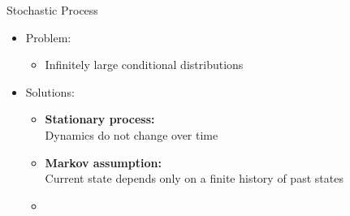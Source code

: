 \documentclass[11pt,table]{beamer}
\begin{document}
\begin{frame}{Stochastic Process}

\begin{itemize}
    \item  Problem:
\begin{itemize}
    \item  Infinitely large conditional distributions
 
\end{itemize}
\item  Solutions:
\begin{itemize}
\item  \textbf{Stationary process:}\\ \textcolor{red1}{Dynamics do not change over time}\\[2ex]
\item \textbf{Markov assumption:}\\ \textcolor{red1}{Current state depends only on a finite history of past states}\\[2ex]
\item \citet[][Section 15.1]{russell2016artificial}
 
\end{itemize}
\end{itemize}
    
\end{frame}
\end{document}
